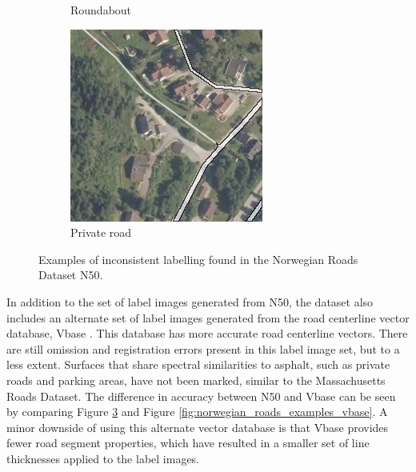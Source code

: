 \begin{figure}[h]
\begin{subfigure}{0.31\textwidth}
\caption{Roundabout} \label{fig:norwegian_roads_roundabout_n50}
\end{subfigure}
\hspace*{\fill} %
\begin{subfigure}{0.31\textwidth}
\includegraphics[width=\linewidth]{figs/datasets/nor_examples/1157_missing_n50.png}
\caption{Private road} \label{fig:norwegian_roads_missing_n50}
\end{subfigure}
\hspace*{\fill} %
\caption[Inconsistent labelling in Norwegian Roads Dataset N50]{Examples of inconsistent labelling found in the Norwegian Roads Dataset N50.} \label{fig:norwegian_roads_examples_n50}
\end{figure}

In addition to the set of label images generated from N50, the dataset also includes an alternate set of label images generated from the road centerline vector database, Vbase \citep{Kartverket_vbase}. This database has more accurate road centerline vectors. There are still omission and registration errors present in this label image set, but to a less extent. Surfaces that share spectral similarities to asphalt, such as private roads and parking areas, have not been marked, similar to the Massachusetts Roads Dataset. The difference in accuracy between N50 and Vbase can be seen by comparing Figure \ref{fig:norwegian_roads_examples_n50} and Figure \ref{fig:norwegian_roads_examples_vbase}. A minor downside of using this alternate vector database is that Vbase provides fewer road segment properties, which have resulted in a smaller set of line thicknesses applied to the label images.\\

